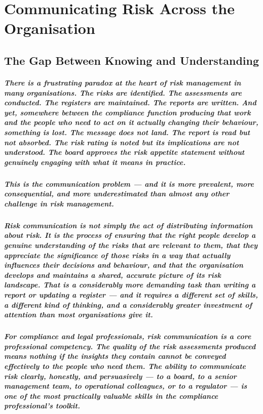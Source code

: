 \chapter{Communicating Risk Across the Organisation}
\label{chap:Communicating Risk Across the Organisation}

\section{The Gap Between Knowing and Understanding}
\paragraph{There is a frustrating paradox at the heart of risk management in many organisations. The risks are identified. The assessments are conducted. The registers are maintained. The reports are written. And yet, somewhere between the compliance function producing that work and the people who need to act on it actually changing their behaviour, something is lost. The message does not land. The report is read but not absorbed. The risk rating is noted but its implications are not understood. The board approves the risk appetite statement without genuinely engaging with what it means in practice.}
\paragraph{This is the communication problem — and it is more prevalent, more consequential, and more underestimated than almost any other challenge in risk management.}
\paragraph{Risk communication is not simply the act of distributing information about risk. It is the process of ensuring that the right people develop a genuine understanding of the risks that are relevant to them, that they appreciate the significance of those risks in a way that actually influences their decisions and behaviour, and that the organisation develops and maintains a shared, accurate picture of its risk landscape. That is a considerably more demanding task than writing a report or updating a register — and it requires a different set of skills, a different kind of thinking, and a considerably greater investment of attention than most organisations give it.}
\paragraph{For compliance and legal professionals, risk communication is a core professional competency. The quality of the risk assessments produced means nothing if the insights they contain cannot be conveyed effectively to the people who need them. The ability to communicate risk clearly, honestly, and persuasively — to a board, to a senior management team, to operational colleagues, or to a regulator — is one of the most practically valuable skills in the compliance professional's toolkit.}
